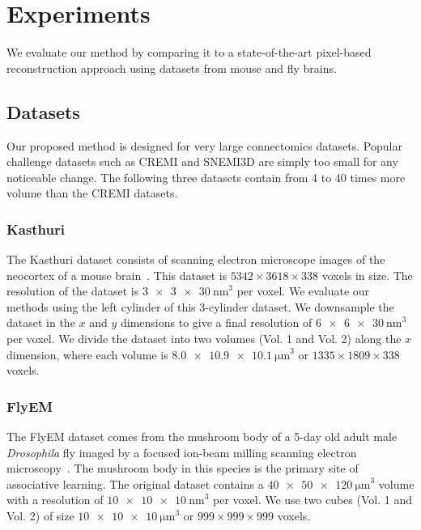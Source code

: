 \section{Experiments}

We evaluate our method by comparing it to a state-of-the-art pixel-based reconstruction approach using datasets from mouse and fly brains.

\subsection{Datasets}
\label{sec:dataset}

Our proposed method is designed for very large connectomics datasets. 
Popular challenge datasets such as CREMI and SNEMI3D are simply too small for any noticeable change. 
The following three datasets contain from 4 to 40 times more volume than the CREMI datasets. 

\subsubsection{Kasthuri}
The Kasthuri dataset consists of scanning electron microscope images of the neocortex of a mouse brain~\cite{kasthuri2015saturated}. 
This dataset is $5342 \times 3618 \times 338$ voxels in size. 
The resolution of the dataset is $\SI[product-units=single]{3 x 3 x 30}{\nano\meter}^3$ per voxel. 
We evaluate our methods using the left cylinder of this 3-cylinder dataset. 
We downsample the dataset in the $x$ and $y$ dimensions to give a final resolution of $\SI[product-units=single]{6 x 6 x 30}{\nano\meter}^3$ per voxel. 
We divide the dataset into two volumes (Vol. 1 and Vol. 2) along the $x$ dimension, where each volume is $\SI[product-units=single]{8.0 x 10.9 x 10.1}{\micro\meter}^3$ or $1335 \times 1809 \times 338$ voxels.

\subsubsection{FlyEM}
The FlyEM dataset comes from the mushroom body of a 5-day old adult male \textit{Drosophila} fly imaged by a focused ion-beam milling scanning electron microscopy~\cite{takemura2017connectome}.
The mushroom body in this species is the primary site of associative learning. 
The original dataset contains a $\SI[product-units=single]{40 x 50 x 120}{\micro\meter}^3$ volume with a resolution of $\SI[product-units=single]{10 x 10 x 10}{\nano\meter}^3$ per voxel. 
We use two cubes (Vol. 1 and Vol. 2) of size $\SI[product-units=single]{10 x 10 x 10}{\micro\meter}^3$ or $999 \times 999 \times 999$ voxels.

